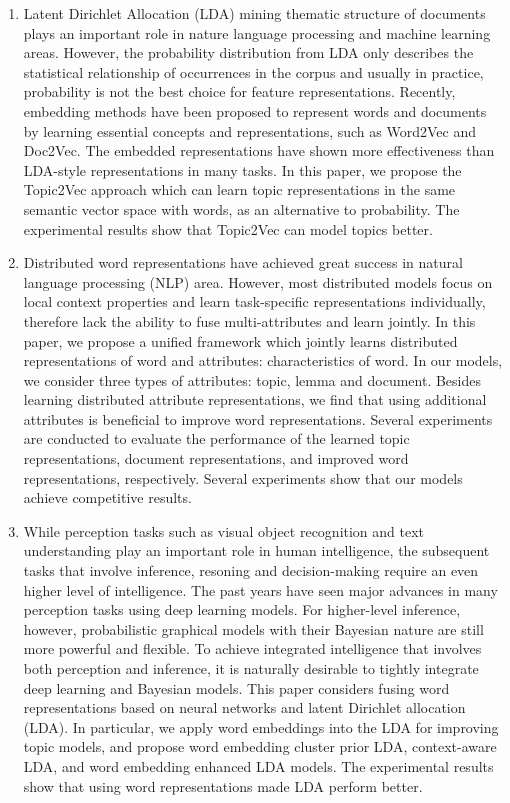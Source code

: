 \documentclass[master]{njuthesis}
\begin{document}
\begin{englishabstract}
\begin{enumerate}
\item Latent Dirichlet Allocation (LDA) mining thematic structure of documents plays an important role in nature language processing and machine learning areas. However, the probability distribution from LDA only describes the statistical relationship of occurrences in the corpus and usually in practice, probability is not the best choice for feature representations. Recently, embedding methods have been proposed to represent words and documents by learning essential concepts and representations, such as Word2Vec and Doc2Vec. The embedded representations   have shown more effectiveness than LDA-style representations in many tasks. In this paper, we propose the Topic2Vec approach which can learn topic representations in the same semantic vector space with words, as an alternative to probability. The experimental results show that Topic2Vec can model topics better.
\item Distributed word representations have achieved great success in natural language processing (NLP) area. However, most distributed models focus on local context properties and learn task-specific representations individually, therefore lack the ability to fuse multi-attributes and learn jointly. In this paper, we propose a unified framework which jointly learns distributed representations of word and attributes: characteristics of word. In our models, we consider three types of attributes: topic, lemma and document. Besides learning distributed attribute representations, we find that using additional attributes is beneficial to improve word representations. Several experiments are conducted to evaluate the performance of the learned topic representations, document representations, and improved word representations, respectively. Several experiments show that our models achieve competitive results.
\item While perception tasks such as visual object recognition and text understanding play an important role in human intelligence, the subsequent tasks that involve inference, resoning and decision-making require an even higher level of intelligence. The past years have seen major advances in many perception tasks using deep learning models. For higher-level inference, however, probabilistic graphical models with their Bayesian nature are still more powerful and flexible. To achieve integrated intelligence that involves both perception and inference, it is naturally desirable to tightly integrate deep learning and Bayesian models. This paper considers fusing word representations based on neural networks and latent Dirichlet allocation (LDA). In particular, we apply word embeddings into the LDA for improving topic models, and propose word embedding cluster prior LDA, context-aware LDA, and word embedding enhanced LDA models. The experimental results show that using word representations made LDA perform better.

\end{enumerate}
\end{englishabstract}
\end{document}
